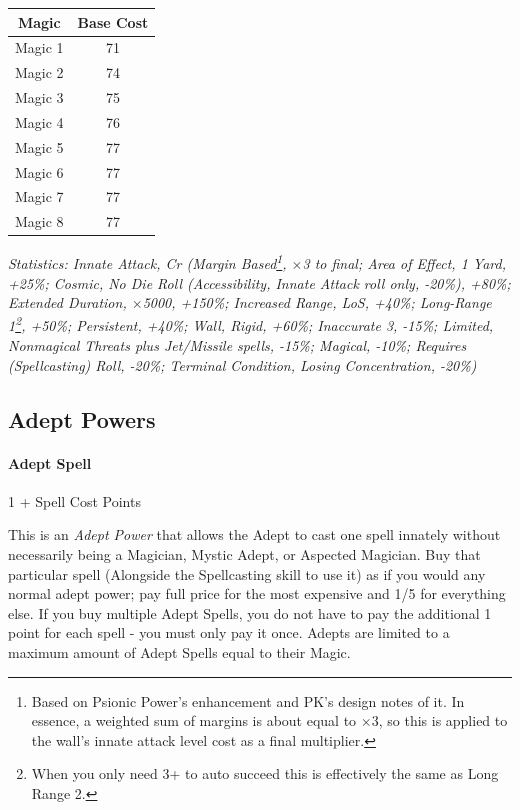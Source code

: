 \begin{multicols}{3}
	\begin{center}
		\begin{tabular}{|c|c|}
			\hline
			Magic & Base Cost \\
			\hline
			\hline
			Magic 1 & 71 \\
			Magic 2 & 74 \\
			Magic 3 & 75 \\
			Magic 4 & 76 \\
			Magic 5 & 77 \\
			Magic 6 & 77 \\
			Magic 7 & 77 \\
			Magic 8 & 77 \\
			\hline
		\end{tabular}
	\end{center}
	
	\textcolor{OliveGreen}{\textit{Statistics: Innate Attack, Cr (Margin Based\footnote{Based on Psionic Power's enhancement and PK's design notes of it. In essence, a weighted sum of margins is about equal to $\times$3, so this is applied to the wall's innate attack level cost as a final multiplier.}, $\times$3 to final; Area of Effect, 1 Yard, +25\%; Cosmic, No Die Roll (Accessibility, Innate Attack roll only, -20\%), +80\%; Extended Duration, $\times$5000, +150\%; Increased Range, LoS, +40\%; Long-Range 1\footnote{When you only need 3+ to auto succeed this is effectively the same as Long Range 2.}, +50\%; Persistent, +40\%; Wall, Rigid, +60\%; Inaccurate 3, -15\%; Limited, Nonmagical Threats plus Jet/Missile spells, -15\%; Magical, -10\%; Requires (Spellcasting) Roll, -20\%; Terminal Condition, Losing Concentration, -20\%)}}

	\subsection{Adept Powers}
	
	\paragraph{Adept Spell}
	\begin{flushright}
		1 + Spell Cost Points
	\end{flushright}
	
	This is an \textit{Adept Power} that allows the Adept to cast one spell innately without necessarily being a Magician, Mystic Adept, or Aspected Magician. Buy that particular spell (Alongside the Spellcasting skill to use it) as if you would any normal adept power; pay full price for the most expensive and 1/5 for everything else. If you buy multiple Adept Spells, you do not have to pay the additional 1 point for each spell - you must only pay it once. Adepts are limited to a maximum amount of Adept Spells equal to their Magic.
	

\end{multicols}
